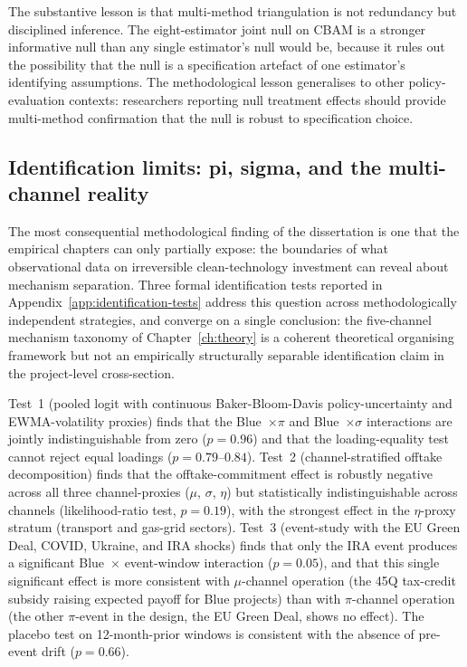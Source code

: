 The substantive lesson is that multi-method triangulation is not redundancy but disciplined inference. The eight-estimator joint null on CBAM is a stronger informative null than any single estimator's null would be, because it rules out the possibility that the null is a specification artefact of one estimator's identifying assumptions. The methodological lesson generalises to other policy-evaluation contexts: researchers reporting null treatment effects should provide multi-method confirmation that the null is robust to specification choice.

\subsection{Identification limits: pi, sigma, and the multi-channel reality}
\label{sec:disc-identification-tests}

The most consequential methodological finding of the dissertation is one that the empirical chapters can only partially expose: the boundaries of what observational data on irreversible clean-technology investment can reveal about mechanism separation. Three formal identification tests reported in Appendix~\ref{app:identification-tests} address this question across methodologically independent strategies, and converge on a single conclusion: the five-channel mechanism taxonomy of Chapter~\ref{ch:theory} is a coherent theoretical organising framework but not an empirically structurally separable identification claim in the project-level cross-section.

Test~1 (pooled logit with continuous Baker-Bloom-Davis policy-uncertainty and EWMA-volatility proxies) finds that the Blue~$\times \pi$ and Blue~$\times \sigma$ interactions are jointly indistinguishable from zero ($p = 0.96$) and that the loading-equality test cannot reject equal loadings ($p = 0.79$--$0.84$). Test~2 (channel-stratified offtake decomposition) finds that the offtake-commitment effect is robustly negative across all three channel-proxies ($\mu$, $\sigma$, $\eta$) but statistically indistinguishable across channels (likelihood-ratio test, $p = 0.19$), with the strongest effect in the $\eta$-proxy stratum (transport and gas-grid sectors). Test~3 (event-study with the EU Green Deal, COVID, Ukraine, and IRA shocks) finds that only the IRA event produces a significant Blue~$\times$ event-window interaction ($p = 0.05$), and that this single significant effect is more consistent with $\mu$-channel operation (the 45Q tax-credit subsidy raising expected payoff for Blue projects) than with $\pi$-channel operation (the other $\pi$-event in the design, the EU Green Deal, shows no effect). The placebo test on 12-month-prior windows is consistent with the absence of pre-event drift ($p = 0.66$).

